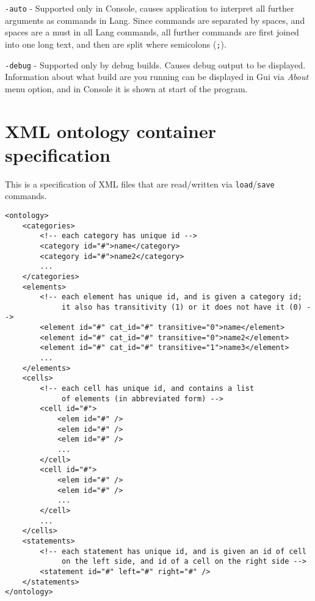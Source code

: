 \documentclass{article}
\begin{document}
\verb|-auto| - Supported only in Console, causes application to interpret all further arguments 
as commands in Lang. Since commands are separated by spaces, and spaces are a must in all Lang commands,
all further commands are first joined into one long text, and then are split where semicolons (\verb|;|).

\verb|-debug| - Supported only by debug builds. Causes debug output to be displayed. Information 
about what build are you running can be 
displayed in Gui via \textit{About} menu option, and in Console it is shown at start of the program.

\section{XML ontology container specification}
This is a specification of XML files that are read/written via \verb|load|/\verb|save| commands.

\begin{verbatim}
<ontology>
	<categories>
		<!-- each category has unique id -->
		<category id="#">name</category>
		<category id="#">name2</category>
		...
	</categories>
	<elements>
		<!-- each element has unique id, and is given a category id; 
		     it also has transitivity (1) or it does not have it (0) -->
		<element id="#" cat_id="#" transitive="0">name</element>
		<element id="#" cat_id="#" transitive="0">name2</element>
		<element id="#" cat_id="#" transitive="1">name3</element>
		...
	</elements>
	<cells>
		<!-- each cell has unique id, and contains a list 
		     of elements (in abbreviated form) -->
		<cell id="#">
			<elem id="#" />
			<elem id="#" />
			<elem id="#" />
			...
		</cell>
		<cell id="#">
			<elem id="#" />
			<elem id="#" />
			...
		</cell>
		...
	</cells>
	<statements>
		<!-- each statement has unique id, and is given an id of cell 
		     on the left side, and id of a cell on the right side -->
		<statement id="#" left="#" right="#" />
	</statements>
</ontology>
\end{verbatim}
\end{document}
